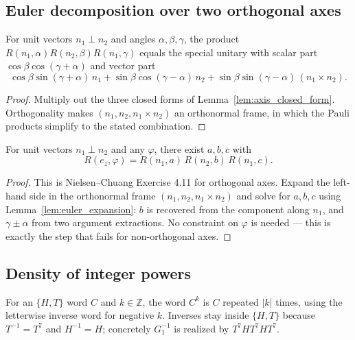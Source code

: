 \subsection{Euler decomposition over two orthogonal axes}

\begin{lemma}
  \label{lem:euler_expansion}
  \leanok
  For unit vectors $n_1 \perp n_2$ and angles $\alpha,\beta,\gamma$, the
  product $R(n_1,\alpha)R(n_2,\beta)R(n_1,\gamma)$ equals the special unitary
  with scalar part $\cos\beta\cos(\gamma+\alpha)$ and vector part
  \[
    \cos\beta\sin(\gamma{+}\alpha)\,n_1
      + \sin\beta\cos(\gamma{-}\alpha)\,n_2
      + \sin\beta\sin(\gamma{-}\alpha)\,(n_1\times n_2).
  \]
\end{lemma}

\begin{proof}
  \leanok
  Multiply out the three closed forms of Lemma~\ref{lem:axis_closed_form}.
  Orthogonality makes $(n_1, n_2, n_1\times n_2)$ an orthonormal frame, in
  which the Pauli products simplify to the stated combination.
\end{proof}

\begin{lemma}
  \label{lem:euler_orthogonal}
  \leanok
  For unit vectors $n_1 \perp n_2$ and any $\varphi$, there exist
  $a, b, c$ with
  \[
    R(e_z, \varphi) = R(n_1, a)\, R(n_2, b)\, R(n_1, c).
  \]
\end{lemma}

\begin{proof}
  \leanok
  This is Nielsen--Chuang Exercise 4.11 for orthogonal axes.  Expand the
  left-hand side in the orthonormal frame $(n_1,n_2,n_1\times n_2)$ and solve
  for $a, b, c$ using Lemma~\ref{lem:euler_expansion}: $b$ is recovered from
  the component along $n_1$, and $\gamma \pm \alpha$ from two argument
  extractions.  No constraint on $\varphi$ is needed --- this is exactly the
  step that fails for non-orthogonal axes.
\end{proof}

\subsection{Density of integer powers}

\begin{definition}
  \label{def:zpow_circuit}
  \leanok
  For an $\{H,T\}$ word $C$ and $k \in \mathbb{Z}$, the word $C^{k}$ is
  $C$ repeated $\lvert k\rvert$ times, using the letterwise inverse word for
  negative $k$.  Inverses stay inside $\{H,T\}$ because $T^{-1} = T^7$ and
  $H^{-1} = H$; concretely $G_1^{-1}$ is realized by $T^7HT^7HT^7$.
\end{definition}

